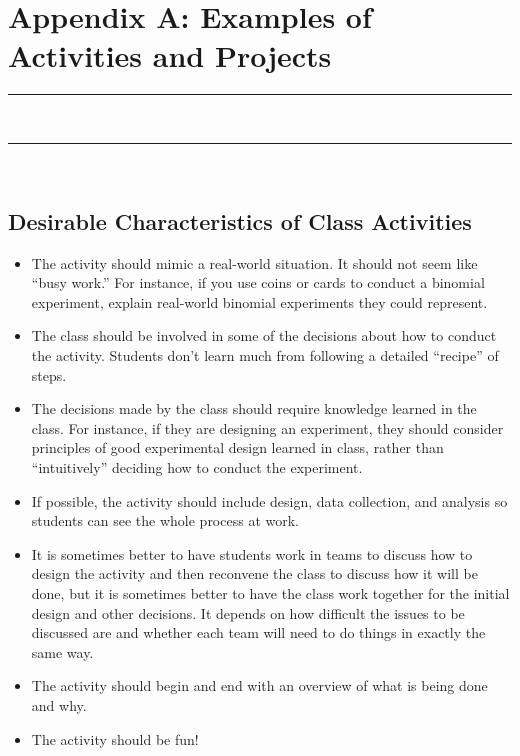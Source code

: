 \chapter{Appendix A: Examples of Activities and Projects}
\vspace{-.53in}
   \noindent\color{graylight}\rule[0cm]{3.25in}{0.03cm} \\
    \noindent\color{graylight}\rule[0.4cm]{3.25in}{0.03cm} \\
\color{black}
\vspace{-.25in}

\renewcommand{\labelitemi}{$\filledsquare$}

\section{\textbf{Desirable Characteristics of Class Activities}}
\begin{itemize}[leftmargin=1cm, itemsep=.2em]
\item The activity should mimic a real-world situation. It should not seem like ``busy work.'' For instance, if you use coins or cards to conduct a binomial experiment, explain real-world binomial experiments they could represent. 
\item The class should be involved in some of the decisions about how to conduct the activity. Students don't learn much from following a detailed ``recipe'' of steps.
\item The decisions made by the class should require knowledge learned in the class. For instance, if they are designing an experiment, they should consider principles of good experimental design learned in class, rather than ``intuitively'' deciding how to conduct the experiment.
\item If possible, the activity should include design, data collection, and analysis so students can see the whole process at work. 
\item It is sometimes better to have students work in teams to discuss how to design the activity and then reconvene the class to discuss how it will be done, but it is sometimes better to have the class work together for the initial design and other decisions. It depends on how difficult the issues to be discussed are and whether each team will need to do things in exactly the same way.
\item The activity should begin and end with an overview of what is being done and why.
\item The activity should be fun!
\end{itemize}
\pagebreak

